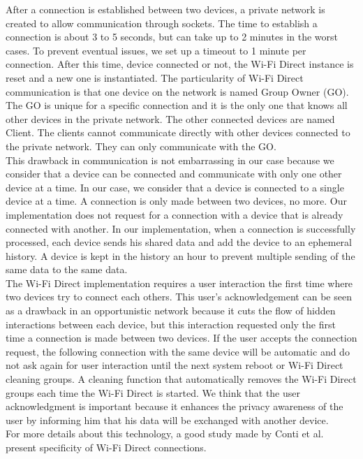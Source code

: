After a connection is established between two devices, a private network is created to allow communication through sockets.
The time to establish a connection is about 3 to 5 seconds, but can take up to 2 minutes in the worst cases.
To prevent eventual issues, we set up a timeout to 1 minute per connection.
After this time, device connected or not, the Wi-Fi Direct instance is reset and a new one is instantiated.
The particularity of Wi-Fi Direct communication is that one device on the network is named Group Owner (GO).
The GO is unique for a specific connection and it is the only one that knows all other devices in the private network.
The other connected devices are named Client.
The clients cannot communicate directly with other devices connected to the private network.
They can only communicate with the GO.
\\

This drawback in communication is not embarrassing in our case because we consider that a device can be connected and communicate with only one other device at a time.
In our case, we consider that a device is connected to a single device at a time.
A connection is only made between two devices, no more.
Our implementation does not request for a connection with a device that is already connected with another.
In our implementation, when a connection is successfully processed, each device sends his shared data and add the device to an ephemeral history.
A device is kept in the history an hour to prevent multiple sending of the same data to the same data.
\\

The Wi-Fi Direct implementation requires a user interaction the first time where two devices try to connect each others.
This user's acknowledgement can be seen as a drawback in an opportunistic network because it cuts the flow of hidden interactions between each device, but this interaction requested only the first time a connection is made between two devices.
If the user accepts the connection request, the following connection with the same device will be automatic and do not ask again for user interaction until the next system reboot or Wi-Fi Direct cleaning groups.
A cleaning function that automatically removes the Wi-Fi Direct groups each time the Wi-Fi Direct is started.
We think that the user acknowledgment is important because it enhances the privacy awareness of the user by informing him that his data will be exchanged with another device.
\\

For more details about this technology, a good study made by Conti et al.~\cite{DBLP:conf/wd/ContiDMP13} present specificity of Wi-Fi Direct connections.

